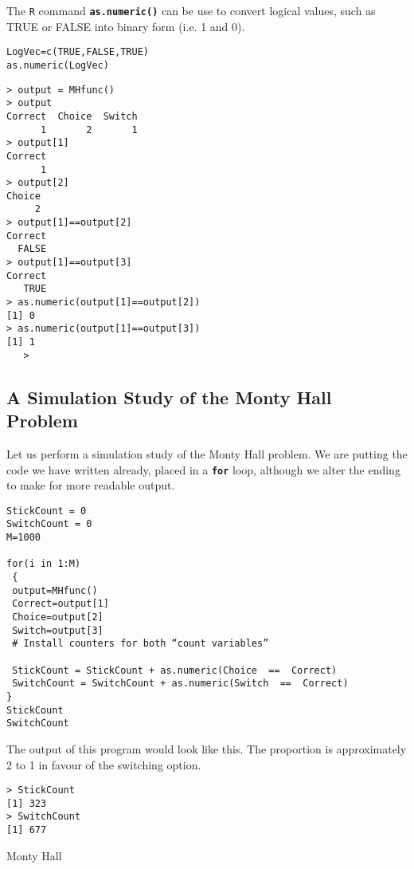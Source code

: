 \documentclass[a4paper,12pt]{article}
\begin{document}
The \texttt{R} command \texttt{\textbf{as.numeric()}} can be use to convert logical values, such as TRUE or FALSE into binary form (i.e. 1 and 0).

\begin{framed}
\begin{verbatim}
LogVec=c(TRUE,FALSE,TRUE)
as.numeric(LogVec)
\end{verbatim} 
\end{framed}
\begin{verbatim}
> output = MHfunc()
> output
Correct  Choice  Switch 
      1       2       1 
> output[1]
Correct 
      1 
> output[2]
Choice 
     2 
> output[1]==output[2]
Correct 
  FALSE 
> output[1]==output[3]
Correct 
   TRUE
> as.numeric(output[1]==output[2])
[1] 0
> as.numeric(output[1]==output[3])
[1] 1
   > 
\end{verbatim}

\subsection{A Simulation Study of the Monty Hall Problem}

Let us perform a simulation study of the Monty Hall problem. We are putting the code we have written already, placed in a \texttt{\textbf{for}} loop, although we alter the ending to make for more readable output.

\begin{framed}
\begin{verbatim}
StickCount = 0
SwitchCount = 0
M=1000

for(i in 1:M)
 {
 output=MHfunc()
 Correct=output[1]
 Choice=output[2]
 Switch=output[3]
 # Install counters for both “count variables”

 StickCount = StickCount + as.numeric(Choice  ==  Correct)
 SwitchCount = SwitchCount + as.numeric(Switch  ==  Correct)
}
StickCount
SwitchCount
\end{verbatim} 
\end{framed}

The output of this program would look like this. The proportion is approximately 2 to 1 in favour of the switching option.
\begin{verbatim}
> StickCount
[1] 323
> SwitchCount
[1] 677
\end{verbatim}






Monty Hall
\end{document}
